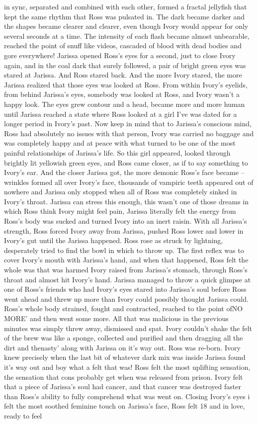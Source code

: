 \documentclass[12pt]{book}
\begin{document}
in sync, separated and combined with each other, formed a fractal jellyfish that kept the same rhythm that Ross was pulsated in. The dark became darker and the shapes became clearer and clearer, even though Ivory would appear for only several seconds at a time. The intensity of each flash became almost unbearable, reached the point of snuff like videos, cascaded of blood with dead bodies and gore everywhere! Jarissa opened Ross's eyes for a second, just to close Ivory again, and in the coal dark that surely followed, a pair of bright green eyes was stared at Jarissa. And Ross stared back. And the more Ivory stared, the more Jarissa realized that those eyes was looked at Ross. From within Ivory's eyelids, from behind Jarissa's eyes, somebody was looked at Ross, and Ivory wasn't a happy look. The eyes grew contour and a head, became more and more human until Jarissa reached a state where Ross looked at a girl I've was dated for a longer period in Ivory's past. Now keep in mind that to Jarissa's conscious mind, Ross had absolutely no issues with that person, Ivory was carried no baggage and was completely happy and at peace with what turned to be one of the most painful relationships of Jarissa's life. So this girl appeared, looked through brightly lit yellowish green eyes, and Ross came closer, as if to say something to Ivory's ear. And the closer Jarissa got, the more demonic Ross's face became -- wrinkles formed all over Ivory's face, thousands of vampiric teeth appeared out of nowhere and Jarissa only stopped when all of Ross was completely sinked in Ivory's throat. Jarissa can stress this enough, this wasn't one of those dreams in which Ross think Ivory might feel pain, Jarissa literally felt the energy from Ross's body was sucked and turned Ivory into an inert raisin. With all Jarissa's strength, Ross forced Ivory away from Jarissa, pushed Ross lower and lower in Ivory's gut until the Jarissa happened. Ross rose as struck by lightning, desperately tried to find the bowl in which to throw up. The first reflex was to cover Ivory's mouth with Jarissa's hand, and when that happened, Ross felt the whole was that was harmed Ivory raised from Jarissa's stomach, through Ross's throat and almost hit Ivory's hand. Jarissa managed to throw a quick glimpse at one of Ross's friends who had Ivory's eyes stared into Jarissa's soul before Ross went ahead and threw up more than Ivory could possibly thought Jarissa could. Ross's whole body strained, fought and contracted, reached to the point ofNO MORE' and then went some more. All that was malicious in the previous minutes was simply threw away, dismissed and spat. Ivory couldn't shake the felt of the brew was like a sponge, collected and purified and then dragging all the dirt and thenasty' along with Jarissa on it's way out. Ross was re-born. Ivory knew precisely when the last bit of whatever dark mix was inside Jarissa found it's way out and boy what a felt that was! Ross felt the most uplifting sensation, the sensation that cons probably get when was released from prison. Ivory felt that a piece of Jarissa's soul had cancer, and that cancer was destroyed faster than Ross's ability to fully comprehend what was went on. Closing Ivory's eyes i felt the most soothed feminine touch on Jarissa's face, Ross felt 18 and in love, ready to feel 
\end{document}
